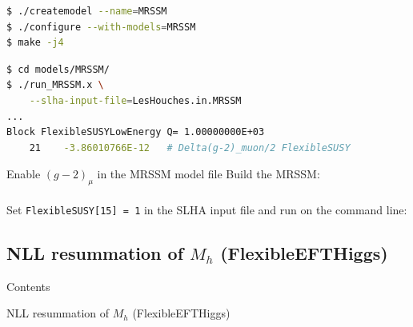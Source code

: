 \documentclass[hyperref={pdfpagelabels=false},ngerman]{beamer}
\newcommand{\SM}{\ensuremath{\text{SM}}}
\newcommand{\MRSSM}{\ensuremath{\text{MRSSM}}}
\begin{document}
\begin{lrbox}{\listbox}\begin{lstlisting}[language=bash]
$ ./createmodel --name=MRSSM
$ ./configure --with-models=MRSSM
$ make -j4
\end{lstlisting}\end{lrbox} %

\begin{lrbox}{\listboxt}\begin{lstlisting}[language=bash]
$ cd models/MRSSM/
$ ./run_MRSSM.x \
    --slha-input-file=LesHouches.in.MRSSM
...
Block FlexibleSUSYLowEnergy Q= 1.00000000E+03
    21    -3.86010766E-12   # Delta(g-2)_muon/2 FlexibleSUSY
\end{lstlisting}\end{lrbox} %

\begin{frame}{Enable $(g-2)_\mu$ in the MRSSM model file}
  Build the MRSSM:\\[1.5em]
  \usebox{\listbox}
  \\[1em]
  Set \texttt{FlexibleSUSY[15] = 1} in the SLHA input file and run on
  the command line:
  \\[1.5em]
  \usebox{\listboxt}
\end{frame}

\subsection{NLL resummation of $M_h$ (FlexibleEFTHiggs)}

\begin{frame}{Contents}
  \tableofcontents[currentsubsection,sectionstyle=show/shaded]  
\end{frame}

\begin{frame}{NLL resummation of $M_h$ (FlexibleEFTHiggs)}
  \begin{center}
  \end{center}
\end{frame}
\end{document}

